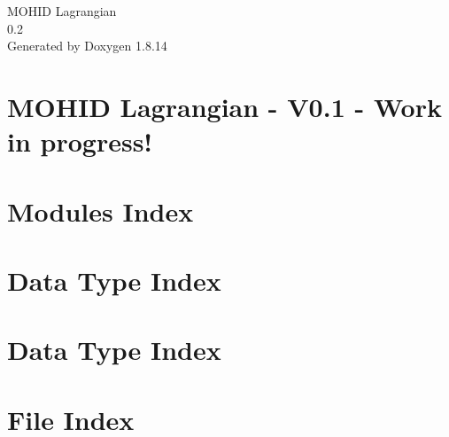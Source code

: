 \documentclass[twoside]{book}
\newcommand{\+}{\discretionary{\mbox{\scriptsize$\hookleftarrow$}}{}{}}
\newcommand{\clearemptydoublepage}{%
  \newpage{\pagestyle{empty}\cleardoublepage}%
}
\begin{document}
\hypersetup{pageanchor=false,
             bookmarksnumbered=true,
             pdfencoding=unicode
            }
\begin{titlepage}
\vspace*{7cm}
\begin{center}%
{\Large M\+O\+H\+ID Lagrangian \\[1ex]\large 0.\+2 }\\
\vspace*{1cm}
{\large Generated by Doxygen 1.8.14}\\
\end{center}
\end{titlepage}
\clearemptydoublepage
{}
\tableofcontents
\clearemptydoublepage
{}
\hypersetup{pageanchor=true}

\chapter{M\+O\+H\+ID Lagrangian -\/ V0.1 -\/ Work in progress!}
\label{index}\hypertarget{index}{}
\chapter{Modules Index}

\chapter{Data Type Index}

\chapter{Data Type Index}

\chapter{File Index}

\end{document}
